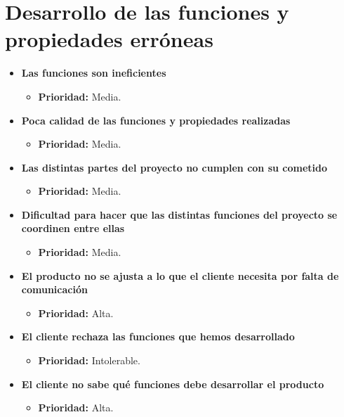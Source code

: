 \documentclass[spanish,a4paper,12pt]{report}	%
\begin{document}
\section{Desarrollo de las funciones y propiedades erróneas}
	\begin{itemize}
		\item \textbf{Las funciones son ineficientes}
			\begin{itemize}
				\item \textbf{Prioridad: }Media.
			\end{itemize}
		
		\item \textbf{Poca calidad de las funciones y propiedades realizadas}
			\begin{itemize}
				\item \textbf{Prioridad: }Media.
			\end{itemize}
		
		\item \textbf{Las distintas partes del proyecto no cumplen con su cometido}
			\begin{itemize}
				\item \textbf{Prioridad: }Media.
			\end{itemize}
		
		\item \textbf{Dificultad para hacer que las distintas funciones del proyecto se coordinen entre ellas}
			\begin{itemize}
				\item \textbf{Prioridad: }Media.
			\end{itemize}
		
		\item \textbf{El producto no se ajusta a lo que el cliente necesita por falta de comunicación}%
			\begin{itemize}
				\item \textbf{Prioridad: }Alta.
			\end{itemize}
		
		\item \textbf{El cliente rechaza las funciones que hemos desarrollado}
			\begin{itemize}
				\item \textbf{Prioridad: }Intolerable.
			\end{itemize}
		
		\item \textbf{El cliente no sabe qué funciones debe desarrollar el producto}%
			\begin{itemize}
				\item \textbf{Prioridad: }Alta.
			\end{itemize}
		

\end{itemize}
\end{document}
